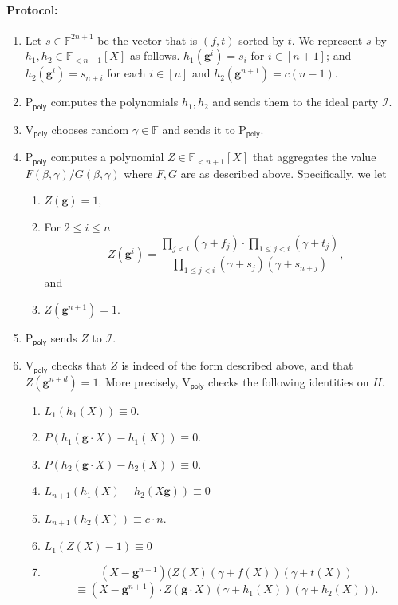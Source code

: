 \documentclass[11pt]{article} %
\newcommand{\F}{\ensuremath{\mathbb F}\xspace}
\newcommand{\dom}{\ensuremath{H}\xspace}
\newcommand{\prvpoly}{\ensuremath{\mathrm{P_{\mathsf{poly}}}}\xspace}
\newcommand{\verpoly}{\ensuremath{\mathrm{V_{\mathsf{poly}}}}\xspace}
\newcommand{\ideal}{\ensuremath{\mathcal{I}}\xspace}
\newcommand{\hgen}{\ensuremath{\mathbf{g}}\xspace}
\newcommand{\cosetgen}{\ensuremath{\mathbf{\kappa}}\xspace}
\newcommand{\polysofdeg}[1]{\ensuremath{\F_{< #1}[X]}\xspace}
\newcommand{\sone}{\ensuremath{ h_1}\xspace}
\newcommand{\stwo}{\ensuremath{ h_{2}}\xspace}
\begin{document}
\paragraph{Protocol:}
\begin{enumerate}
 \item Let $s\in \F^{2n+1}$ be the vector that is $(f,t)$ sorted by $t$. We represent $s$ by $\sone,\stwo \in \polysofdeg{n+1}$ as follows.
$\sone (\hgen^i) = s_i$ for $i\in [n+1]$; and $\stwo(\hgen ^i)= s_{n+i}$ for each $i\in [n]$ and $\stwo(\hgen^{n+1})=c(n-1)$.
 
 \item \prvpoly computes the polynomials $\sone,\stwo$ and sends them to the ideal party \ideal.
 \item \verpoly chooses random $\gamma \in \F$ and sends it to \prvpoly.
 \item \prvpoly computes a polynomial $Z\in \polysofdeg{n+1}$ that aggregates the value $F(\beta,\gamma)/G(\beta,\gamma)$ where $F,G$ are as described above. Specifically, we let
\begin{enumerate}
 \item  $Z(\hgen) = 1$,
\item For $2\leq i \leq n$
\[Z(\hgen^{i})= \frac{\prod_{j < i} (\gamma + f_j)\cdot \prod_{1\leq j < i} (\gamma+ t_j)}{\prod_{1\leq j <i} (\gamma + s_j)(\gamma+ s_{n+j})},\]
 and
\item $Z(\hgen^{n+1})=1$.
\end{enumerate}
 \item \prvpoly sends $Z$ to \ideal.
 \item \verpoly checks that $Z$ is indeed of the form described above, and that $Z(\hgen^{n+d})=1$. More precisely, \verpoly checks the following identities on $H$.
 \begin{enumerate}
\item \label{step:rangefirst} $L_1(\sone(X)) \equiv 0$.
\item$P\left(\sone(\hgen\cdot X)- \sone(X)\right)\equiv 0$.
\item $P\left(\stwo(\hgen\cdot  X)- \stwo(X)\right)\equiv 0$.
  \item\label{check:consisttwo} $L_{n+1}(\sone(X)-\stwo(X \hgen))\equiv 0$
\item \label{step:rangefirstlast}$L_{n+1}(\stwo(X)) \equiv c\cdot n$.
  \item \label{step:rangepermfirst}$L_1(Z(X)-1)\equiv 0$
  \item 
  \[(X-\hgen^{n+1}) (Z(X) (\gamma + f(X))(\gamma+ t(X))\]
  \[\equiv (X-\hgen^{n+1})\cdot  Z(\hgen \cdot X)(\gamma+ \sone(X))(\gamma+ \stwo(X))) .\]


\end{enumerate}
\end{enumerate}
\end{document}
